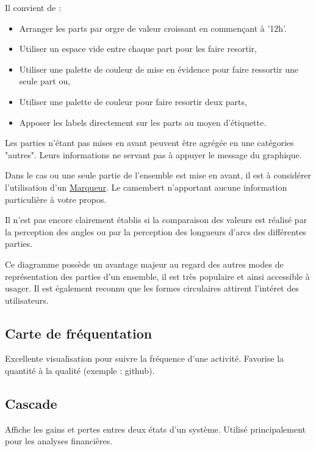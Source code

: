 \documentclass[a4paper,12pt]{article}
\begin{document}
\begin{multicols}{2}
Il convient de :
\begin{itemize}
\item Arranger les parts par orgre de valeur croissant en commençant à '12h'. \autocite{jonathanschwabishParttowhole2021}
\item Utiliser un espace vide entre chaque part pour les faire resortir, \autocite{sosulskiGraphics2019}
\item Utiliser une palette de couleur de mise en évidence pour faire ressortir une seule part ou,
\item Utiliser une palette de couleur pour faire resortir deux parts,
\item Apposer les labels directement sur les parts au moyen d'étiquette. \autocite{sosulskiGraphics2019}
\end{itemize}

Les parties n'étant pas mises en avant peuvent être agrégée en une catégories "autres". Leurs informations ne servant pas à appuyer le message du graphique. \autocite{jonathanschwabishParttowhole2021}

Dans le cas ou une seule partie de l'ensemble est mise en avant, il est à considérer l'utilisation d'un \hyperref[sec:org95ad1eb]{Marqueur}. Le camembert n'apportant aucune information particulière à votre propos.

Il n'est pas encore clairement établis si la comparaison des valeurs est réalisé par la perception des angles ou par la perception des longueurs d'arcs des différentes parties.\autocite{jonathanschwabishParttowhole2021}

Ce diagramme possède un avantage majeur au regard des autres modes de représentation des parties d'un ensemble, il est très populaire et ainsi accessible à usager. \autocite{jonathanschwabishParttowhole2021} Il est également reconnu que les formes circulaires attirent l'intéret des utilisateurs.\autocite{jonathanschwabishParttowhole2021}
\subsection*{Carte de fréquentation}
\label{sec:orgdd8f8c4}
Excellente visualisation pour suivre la fréquence d'une activité. Favorise la quantité à la qualité (exemple : github). \autocite{alansmithLexiqueVisuel}
\subsection*{Cascade}
\label{sec:org38870d8}
Affiche les gains et pertes entres deux états d'un système. \autocite{jonathanschwabishComparingCategories2021} Utilisé principalement pour les analyses financières. \autocite{alansmithLexiqueVisuel}

\end{multicols}
\end{document}
